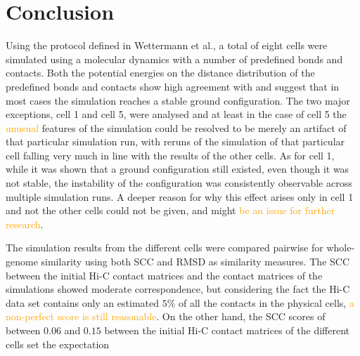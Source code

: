 
\chapter{Conclusion} %
\label{cha:conclusion}

Using the protocol defined in Wettermann et al.\cite{wettermann_minimal_2020}, a total of eight cells were simulated using a molecular dynamics with a number of predefined bonds and contacts. Both the potential energies on the distance distribution of the predefined bonds and contacts show high agreement with \cite{wettermann_minimal_2020} and suggest that in most cases the simulation reaches a stable ground configuration. The two major exceptions, cell 1 and cell 5, were analysed and at least in the case of cell 5 the \textcolor{orange}{unusual} features of the simulation could be resolved to be merely an artifact of that particular simulation run, with reruns of the simulation of that particular cell falling very much in line with the results of the other cells. As for cell 1, while it was shown that a ground configuration still existed, even though it was not stable, the instability of the configuration was consistently observable across multiple simulation runs. A deeper reason for why this effect arises only in cell 1 and not the other cells could not be given, and might \textcolor{orange}{be an issue for further research}.

The simulation results from the different cells were compared pairwise for whole-genome similarity using both SCC and RMSD as similarity measures. The SCC between the initial Hi-C contact matrices and the contact matrices of the simulations showed moderate correspondence, but considering the fact the Hi-C data set contains only an estimated \(5\%\) of all the contacts in the physical cells, \textcolor{orange}{a non-perfect score is still reasonable}. On the other hand, the SCC scores of between \(0.06\) and \(0.15\) between the initial Hi-C contact matrices of the different cells set the expectation 

